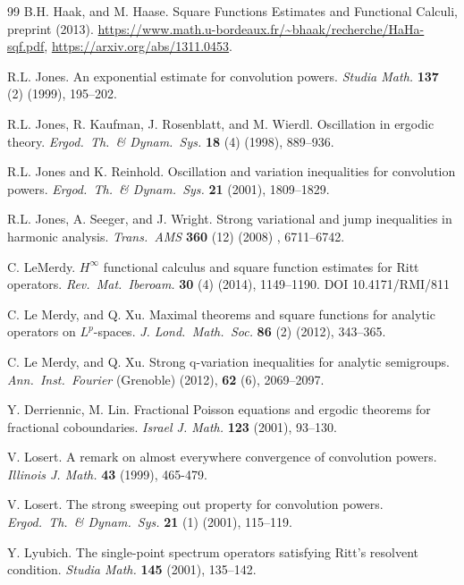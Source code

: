 \documentclass[11pt]{amsart}
\theoremstyle{definition}
\theoremstyle{remark}
\begin{document}
\begin{thebibliography}{99}
 B.H. Haak, and  M. Haase. Square Functions Estimates and Functional Calculi, preprint (2013). \url{https://www.math.u-bordeaux.fr/~bhaak/recherche/HaHa-sqf.pdf}, 
\url{https://arxiv.org/abs/1311.0453}.

 R.L. Jones. An exponential estimate for convolution powers. \textit{Studia Math.}  {\bf 137} (2) (1999), 195--202.

 R.L. Jones, R. Kaufman, J. Rosenblatt, and M. Wierdl. Oscillation in ergodic theory. \textit{Ergod.\ Th.\ \& Dynam.\ Sys.}  {\bf 18} (4) (1998),  889--936.


 R.L. Jones and K. Reinhold. Oscillation and variation inequalities for convolution powers. \textit{Ergod.\ Th.\  \& Dynam.\ Sys.} {\bf 21} (2001), 1809--1829.

 R.L. Jones, A. Seeger, and J. Wright. Strong variational and jump inequalities in harmonic analysis. \textit{Trans.\ AMS} {\bf 360} (12) (2008) ,  6711--6742.

 C. LeMerdy. $H^{\infty}$ functional calculus and square function estimates for Ritt operators. \textit{Rev.\ Mat.\ Iberoam.}   {\bf 30}  (4) (2014), 1149--1190. DOI 10.4171/RMI/811

 C. Le Merdy, and Q. Xu. Maximal theorems and square functions for analytic operators on $L^p$-spaces. \textit{J. Lond.\, Math.\, Soc.}   {\bf 86} (2) (2012), 343--365.

C. Le Merdy, and Q. Xu. Strong q-variation inequalities for analytic semigroups. \textit{Ann.\ Inst.\ Fourier}
(Grenoble)  (2012), {\bf 62} (6), 2069--2097.

 Y. Derriennic, M. Lin. Fractional Poisson equations and ergodic theorems for fractional coboundaries. \textit{Israel J. Math.}  {\bf 123} (2001), 93--130.

 V. Losert. A remark on almost everywhere convergence of convolution powers. \textit{Illinois J. Math.}  {\bf 43}
(1999),  465-479.

 V. Losert. The strong sweeping out property for convolution powers. \textit{Ergod.\ Th.\ \& Dynam.\ Sys.}   
{\bf 21} (1) (2001), 115--119.

  Y. Lyubich. The single-point spectrum operators satisfying Ritt's resolvent condition. \textit{Studia Math.} {\bf 145} (2001), 135--142.


\end{thebibliography}
\end{document}
